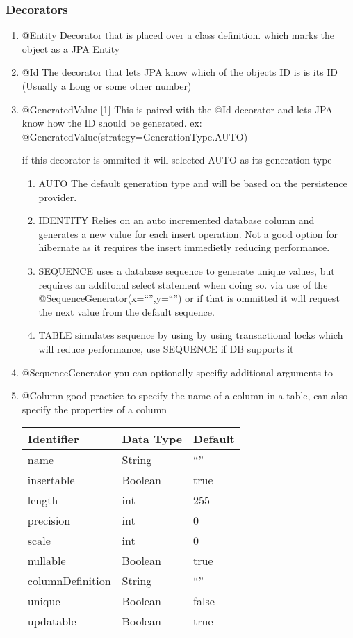 \documentclass[11pt]{article}
\begin{document}
\subsubsection{Decorators}
\label{sec:org1c74d63}
\begin{enumerate}
\item @Entity
\label{sec:orgb5aa77c}
Decorator that is placed over a class definition. which marks the object as a JPA Entity
\item @Id
\label{sec:orga0bf317}
The decorator that lets JPA know which of the objects ID is is its ID (Usually a Long or some other number)
\item @GeneratedValue [1]
\label{sec:orgf9f9838}
This is paired with the @Id decorator and lets JPA know how the ID should be generated. ex: @GeneratedValue(strategy=GenerationType.AUTO)

if this decorator is ommited it will selected AUTO as its generation type

\begin{enumerate}
\item AUTO
\label{sec:org68957d7}
The default generation type and will be based on the persistence provider.
\item IDENTITY
\label{sec:org4a3274c}
Relies on an auto incremented database column and generates a new value for each insert operation. Not a good option for hibernate as it requires the insert immedietly reducing performance.
\item SEQUENCE
\label{sec:org1c0cc2b}
uses a database sequence to generate unique values, but requires an additonal select statement when doing so. via use of the @SequenceGenerator(x=``'',y=``'') or if that is ommitted it will request the next value from the default sequence.
\item TABLE
\label{sec:orga575271}
simulates sequence by using by using transactional locks which will reduce performance, use SEQUENCE if DB supports it
\end{enumerate}
\item @SequenceGenerator
\label{sec:orga24716c}
you can optionally specifiy additional arguments to
\item @Column
\label{sec:orgb79dc50}
good practice to specify the name of a column in a table, can also specify the properties of a column

\begin{center}
\begin{tabular}{lll}
Identifier & Data Type & Default\\
\hline
name & String & ``''\\
insertable & Boolean & true\\
length & int & 255\\
precision & int & 0\\
scale & int & 0\\
nullable & Boolean & true\\
columnDefinition & String & ``''\\
unique & Boolean & false\\
updatable & Boolean & true\\
\end{tabular}
\end{center}



\end{enumerate}
\end{document}
